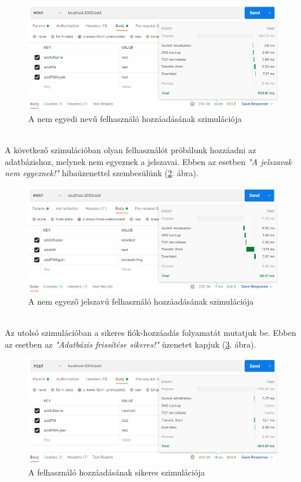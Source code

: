 \begin{figure}[h]
	\centering
		\includegraphics[width=15truecm, height=7truecm]{images/addUserExists.png}
	\caption{A nem egyedi nevű felhasználó hozzáadásának szimulációja}
	\label{fig:addUserExists}
\end{figure}

\newpage

\\

A következő szimulációban olyan felhasználót próbálunk hozzáadni az adatbázishoz, melynek nem egyeznek a jelszavai. Ebben az esetben \textit{"A jelszavak nem egyeznek!"} hibaüzenettel szembesülünk (\ref{fig:addPWNotMatch}. ábra).

\begin{figure}[h]
	\centering
		\includegraphics[width=15truecm, height=7truecm]{images/addPWNotMatch.png}
	\caption{A nem egyező jelszavú felhasználó hozzáadásának szimulációja}
	\label{fig:addPWNotMatch}
\end{figure}

\\

Az utolsó szimulációban a sikeres fiók-hozzáadás folyamatát mutatjuk be. Ebben az esetben az \textit{"Adatbázis frissítése sikeres!"} üzenetet kapjuk (\ref{fig:addSuccess}. ábra).

\begin{figure}[h]
	\centering
		\includegraphics[width=15truecm, height=7truecm]{images/addSuccess.png}
	\caption{A felhasználó hozzáadásának sikeres szimulációja}
	\label{fig:addSuccess}
\end{figure}